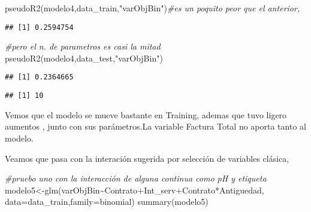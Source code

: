 \documentclass[
]{article}
\newenvironment{Shaded}{\begin{snugshade}}{\end{snugshade}}
\newcommand{\AttributeTok}[1]{\textcolor[rgb]{0.77,0.63,0.00}{#1}}
\newcommand{\CommentTok}[1]{\textcolor[rgb]{0.56,0.35,0.01}{\textit{#1}}}
\newcommand{\FunctionTok}[1]{\textcolor[rgb]{0.00,0.00,0.00}{#1}}
\newcommand{\NormalTok}[1]{#1}
\newcommand{\OtherTok}[1]{\textcolor[rgb]{0.56,0.35,0.01}{#1}}
\newcommand{\SpecialCharTok}[1]{\textcolor[rgb]{0.00,0.00,0.00}{#1}}
\newcommand{\StringTok}[1]{\textcolor[rgb]{0.31,0.60,0.02}{#1}}
\begin{document}
\begin{Shaded}
\begin{Highlighting}[]
\FunctionTok{pseudoR2}\NormalTok{(modelo4,data\_train,}\StringTok{"varObjBin"}\NormalTok{)}\CommentTok{\#es un poquito peor que el anterior,}
\end{Highlighting}
\end{Shaded}

\begin{verbatim}
## [1] 0.2594754
\end{verbatim}

\begin{Shaded}
\begin{Highlighting}[]
\CommentTok{\#pero el n. de parametros es casi la mitad}
\FunctionTok{pseudoR2}\NormalTok{(modelo4,data\_test,}\StringTok{"varObjBin"}\NormalTok{)}
\end{Highlighting}
\end{Shaded}

\begin{verbatim}
## [1] 0.2364665
\end{verbatim}

\begin{Shaded}
\end{Shaded}

\begin{verbatim}
## [1] 10
\end{verbatim}

Vemos que el modelo se mueve bastante en Training, ademas que tuvo
ligero aumentos , junto con sus parámetros.La variable Factura Total no
aporta tanto al modelo.

Veamos que pasa con la interación sugerida por selección de variables
clásica,

\begin{Shaded}
\begin{Highlighting}[]
\CommentTok{\#pruebo uno con la interacción de alguna continua como pH y etiqueta}
\NormalTok{modelo5}\OtherTok{\textless{}{-}}\FunctionTok{glm}\NormalTok{(varObjBin}\SpecialCharTok{\textasciitilde{}}\NormalTok{Contrato}\SpecialCharTok{+}\NormalTok{Int\_serv}\SpecialCharTok{+}\NormalTok{Contrato}\SpecialCharTok{*}\NormalTok{Antiguedad,}
             \AttributeTok{data=}\NormalTok{data\_train,}\AttributeTok{family=}\NormalTok{binomial)}
\FunctionTok{summary}\NormalTok{(modelo5)}
\end{Highlighting}
\end{Shaded}
\end{document}
